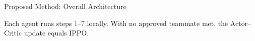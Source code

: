 \documentclass[aspectratio=169,10pt]{beamer}
\begin{document}
\begin{frame}{Proposed Method: Overall Architecture}
\centering
\resizebox{\linewidth}{!}{}

\vspace{6pt}
{\footnotesize Each agent runs steps 1--7 locally. With no approved teammate met, the Actor--Critic update equals IPPO.}
\end{frame}
\end{document}
